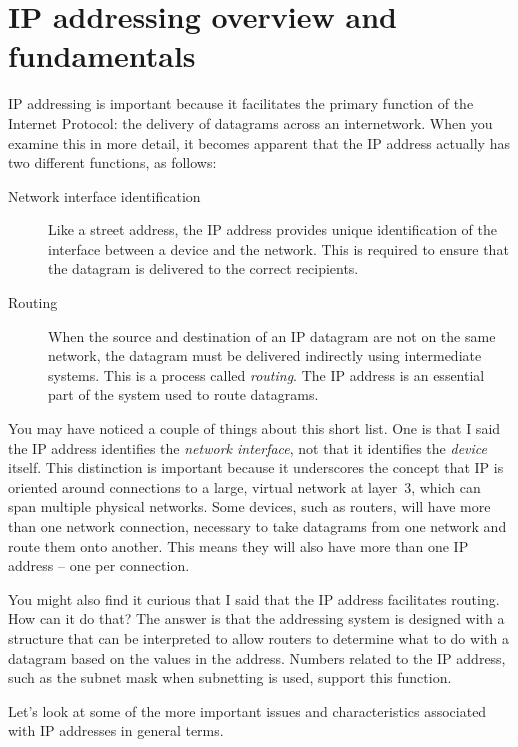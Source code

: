 \section{IP addressing overview and fundamentals}


IP addressing is important because it facilitates the primary function of the Internet Protocol: the delivery of datagrams across an internetwork.
When you examine this in more detail, it becomes apparent that the IP address actually has two different functions, as follows:
\begin{description}
   \item[Network interface identification]
      Like a street address, the IP address provides unique identification of the interface between a device and the network.
      This is required to ensure that the datagram is delivered to the correct recipients.
   \item[Routing]
      When the source and destination of an IP datagram are not on the same network, the datagram must be delivered indirectly using intermediate systems.
      This is a process called \emph{routing}.
      The IP address is an essential part of the system used to route datagrams.
\end{description}

You may have noticed a couple of things about this short list.
One is that I said the IP address identifies the {\emph{network interface}},
not that it identifies the \emph{device} itself. This distinction is
important because it underscores the concept that IP is oriented around
connections to a large, virtual network at layer~3, which can span multiple physical networks.
Some devices, such as routers, will have more than one network connection, necessary to take datagrams from one network and route them onto another.
This means they will also have more than one IP address -- one per connection.

You might also find it curious that I said that the IP address facilitates routing.
How can it do that?
The answer is that the addressing system is designed with a structure that can be interpreted to allow routers to determine what to do with a datagram based on the values in the address.
Numbers related to the IP address, such as the subnet mask when subnetting is used, support this function.

Let's look at some of the more important issues and characteristics associated with IP addresses in general terms.



